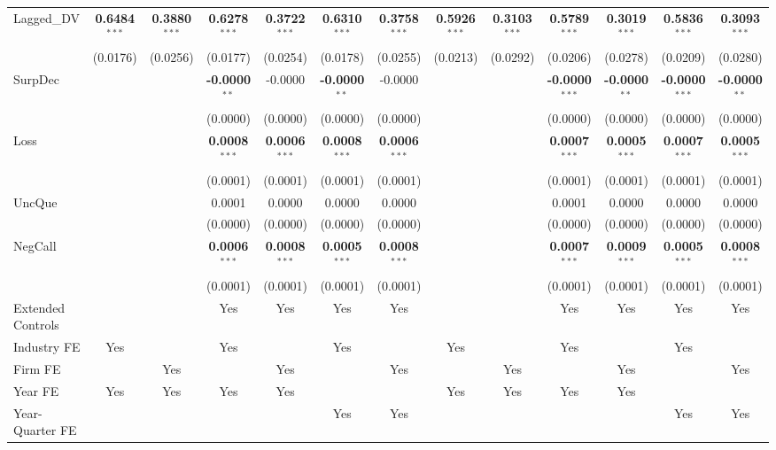 \documentclass[11pt,a4paper]{article}
\begin{document}
\begin{table}[htbp]
\begin{tabular}{lcccccccccccc}
Lagged\_DV & \textbf{0.6484}$^{***}$ & \textbf{0.3880}$^{***}$ & \textbf{0.6278}$^{***}$ & \textbf{0.3722}$^{***}$ & \textbf{0.6310}$^{***}$ & \textbf{0.3758}$^{***}$ & \textbf{0.5926}$^{***}$ & \textbf{0.3103}$^{***}$ & \textbf{0.5789}$^{***}$ & \textbf{0.3019}$^{***}$ & \textbf{0.5836}$^{***}$ & \textbf{0.3093}$^{***}$ \\
 & (0.0176) & (0.0256) & (0.0177) & (0.0254) & (0.0178) & (0.0255) & (0.0213) & (0.0292) & (0.0206) & (0.0278) & (0.0209) & (0.0280) \\
SurpDec &  &  & \textbf{-0.0000}$^{**}$ & -0.0000 & \textbf{-0.0000}$^{**}$ & -0.0000 &  &  & \textbf{-0.0000}$^{***}$ & \textbf{-0.0000}$^{**}$ & \textbf{-0.0000}$^{***}$ & \textbf{-0.0000}$^{**}$ \\
 &  &  & (0.0000) & (0.0000) & (0.0000) & (0.0000) &  &  & (0.0000) & (0.0000) & (0.0000) & (0.0000) \\
Loss &  &  & \textbf{0.0008}$^{***}$ & \textbf{0.0006}$^{***}$ & \textbf{0.0008}$^{***}$ & \textbf{0.0006}$^{***}$ &  &  & \textbf{0.0007}$^{***}$ & \textbf{0.0005}$^{***}$ & \textbf{0.0007}$^{***}$ & \textbf{0.0005}$^{***}$ \\
 &  &  & (0.0001) & (0.0001) & (0.0001) & (0.0001) &  &  & (0.0001) & (0.0001) & (0.0001) & (0.0001) \\
UncQue &  &  & 0.0001 & 0.0000 & 0.0000 & 0.0000 &  &  & 0.0001 & 0.0000 & 0.0000 & 0.0000 \\
 &  &  & (0.0000) & (0.0000) & (0.0000) & (0.0000) &  &  & (0.0000) & (0.0000) & (0.0000) & (0.0000) \\
NegCall &  &  & \textbf{0.0006}$^{***}$ & \textbf{0.0008}$^{***}$ & \textbf{0.0005}$^{***}$ & \textbf{0.0008}$^{***}$ &  &  & \textbf{0.0007}$^{***}$ & \textbf{0.0009}$^{***}$ & \textbf{0.0005}$^{***}$ & \textbf{0.0008}$^{***}$ \\
 &  &  & (0.0001) & (0.0001) & (0.0001) & (0.0001) &  &  & (0.0001) & (0.0001) & (0.0001) & (0.0001) \\
\midrule
Extended Controls &  &  & Yes & Yes & Yes & Yes &  &  & Yes & Yes & Yes & Yes \\
Industry FE & Yes &  & Yes &  & Yes &  & Yes &  & Yes &  & Yes &  \\
Firm FE &  & Yes &  & Yes &  & Yes &  & Yes &  & Yes &  & Yes \\
Year FE & Yes & Yes & Yes & Yes &  &  & Yes & Yes & Yes & Yes &  &  \\
Year-Quarter FE &  &  &  &  & Yes & Yes &  &  &  &  & Yes & Yes \\
\midrule

\end{tabular}
\end{table}
\end{document}
